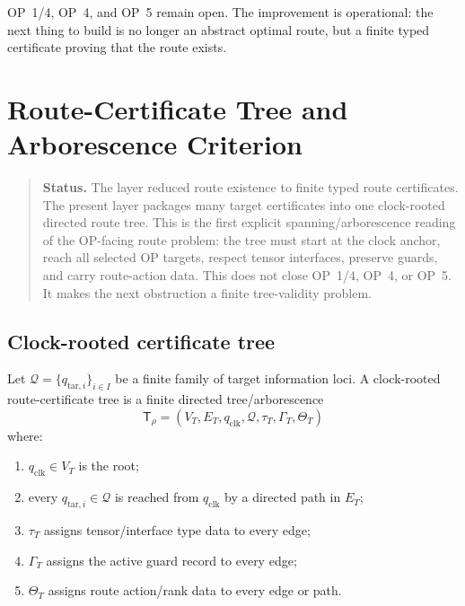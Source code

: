 \begin{remark}
\label{rem:v410r11-op-status}
OP~1/4, OP~4, and OP~5 remain open. The improvement is operational: the next
thing to build is no longer an abstract optimal route, but a finite typed
certificate proving that the route exists.
\end{remark}



\clearpage
\section{Route-Certificate Tree and Arborescence Criterion}
\label{sec:v410r12-route-certificate-tree-arborescence}

\begin{quote}\small
\noindent\textbf{Status.}
The layer reduced route existence to finite typed route certificates. The
present layer packages many target certificates into one clock-rooted
directed route tree. This is the first explicit spanning/arborescence reading
of the OP-facing route problem: the tree must start at the clock anchor, reach
all selected OP targets, respect tensor interfaces, preserve guards, and carry
route-action data. This does not close OP~1/4, OP~4, or OP~5. It makes the
next obstruction a finite tree-validity problem.
\end{quote}

\subsection{Clock-rooted certificate tree}
\label{subsec:v410r12-clock-rooted-certificate-tree}

\begin{definition}
\label{def:v410r12-clock-rooted-route-certificate-tree}
Let \(\mathcal Q=\{q_{\mathrm{tar},i}\}_{i\in I}\) be a finite family of
target information loci. A clock-rooted route-certificate tree is a finite
directed tree/arborescence
\[
 \mathsf T_{\rho}
 =
 (V_T,E_T,q_{\mathrm{clk}},\mathcal Q,\tau_T,\Gamma_T,\Theta_T)
\]
where:
\begin{enumerate}[leftmargin=*]
 \item \(q_{\mathrm{clk}}\in V_T\) is the root;
 \item every \(q_{\mathrm{tar},i}\in\mathcal Q\) is reached from
 \(q_{\mathrm{clk}}\) by a directed path in \(E_T\);
 \item \(\tau_T\) assigns tensor/interface type data to every edge;
 \item \(\Gamma_T\) assigns the active guard record to every edge;
 \item \(\Theta_T\) assigns route action/rank data to every edge or path.
\end{enumerate}
\end{definition}

